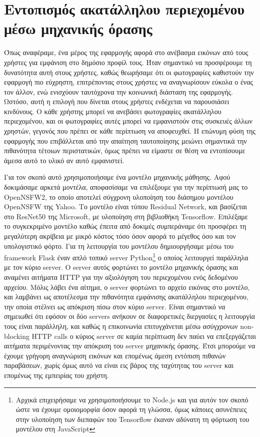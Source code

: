 \documentclass[../thesis.tex]{subfiles}
\begin{document}
\section*{Εντοπισμός ακατάλληλου περιεχομένου μέσω μηχανικής όρασης}
Όπως αναφέραμε, ένα μέρος της εφαρμογής αφορά στο ανέβασμα εικόνων από τους χρήστες για εμφάνιση στο δημόσιο προφίλ τους.
Ήταν σημαντικό να προσφέρουμε τη δυνατότητα αυτή στους χρήστες, καθώς θεωρήσαμε ότι οι φωτογραφίες καθιστούν την εφαρμογή πιο εύχρηστη, επιτρέποντας στους χρήστες να αναγνωρίσουν εύκολα ο ένας τον άλλον, ενώ ενισχύουν ταυτόχρονα την κοινωνική διάσταση της εφαρμογής.
Ωστόσο, αυτή η επιλογή που δίνεται στους χρήστες ενδέχεται να παρουσιάσει κινδύνους.
Ο κάθε χρήστης μπορεί να ανεβάσει φωτογραφίες ακατάλληλου περιεχομένου, και οι φωτογραφίες αυτές μπορεί να εμφανιστούν στις συσκευές άλλων χρηστών, γεγονός που πρέπει σε κάθε περίπτωση να αποφευχθεί.
Η επώνυμη φύση της εφαρμογής που επιβάλλεται από την απαίτηση ταυτοποίησης μειώνει σημαντικά την πιθανότητα τέτοιων περιστατικών, όμως πρέπει να είμαστε σε θέση να εντοπίσουμε άμεσα αυτό το υλικό αν αυτό εμφανιστεί.

Για τον σκοπό αυτό χρησιμοποιήσαμε ένα μοντέλο μηχανικής μάθησης.
Αφού δοκιμάσαμε αρκετά μοντέλα, αποφασίσαμε να επιλέξουμε για την περίπτωσή μας το OpenNSFW2\cite{Yung_Open-NSFW_2_2023}, το οποίο αποτελεί σύγχρονη υλοποίηση του διάσημου μοντέλου OpenNSFW\cite{Mahadeokar_Pesavento_2016} της Yahoo.
Το μοντέλο είναι τύπου Residual Network, και βασίζεται στο ResNet50 της Microsoft, με υλοποίηση στη βιβλιοθήκη Tensorflow.
Επιλέξαμε το συγκεκριμένο μοντέλο καθώς έπειτα από δοκιμές συμπεράναμε ότι προσφέρει τη μεγαλύτερη ακρίβεια με μικρό κόστος τόσο όσον αφορά το μέγεθος όσο και τον υπολογιστικό φόρτο.
Για τη λειτουργία του μοντέλου δημιουργήσαμε μέσω του framework Flask έναν απλό τοπικό server Python\footnote{Αρχικά επιχειρήσαμε να χρησιμοποιήσουμε το Node.js και για αυτόν τον σκοπό ώστε να έχουμε ομοιομορφία όσον αφορά τη γλώσσα, όμως κάποιες ασυνέπειες στην υλοποίηση των διεπαφών του Tensorflow έκαναν αδύνατη τη φόρτωση του μοντέλου στη JavaScript} ο οποίος λειτουργεί παράλληλα με τον κύριο server.
Ο server αυτός φορτώνει το μοντέλο μηχανικής όρασης και αναμένει αιτήματα HTTP για την αξιολόγηση του περιεχομένου ενός δεδομένου αρχείου.
Μόλις λάβει ένα αίτημα, ο server φορτώνει το αρχείο εικόνας στο μοντέλο, και λαμβάνει ως αποτέλεσμα την πιθανότητα εμφάνισης ακατάλληλου περιεχομένου, την οποία στέλνει ως απόκριση πίσω στον κύριο server.
Είναι σημαντικό να σημειωθεί ότι εφόσον οι δύο servers ανήκουν σε διαφορετικές διεργασίες η λειτουργία τους είναι παράλληλη, και καθώς η επικοινωνία επιτυγχάνεται μέσω ασύγχρονων non-blocking HTTP calls ο κύριος server σε καμία περίπτωση δεν παύει να επεξεργάζεται αιτήματα περιμένοντας την απόκριση του server μηχανικής όρασης.
Έτσι μπορούμε να έχουμε γρήγορη αναγνώριση εικόνων και επομένως άμεση εντόπιση πιθανών παραβάσεων, χωρίς όμως αυτό να είναι εις βάρος της ταχύτητας του server και επομένως της εμπειρίας του χρήστη.
\end{document}

